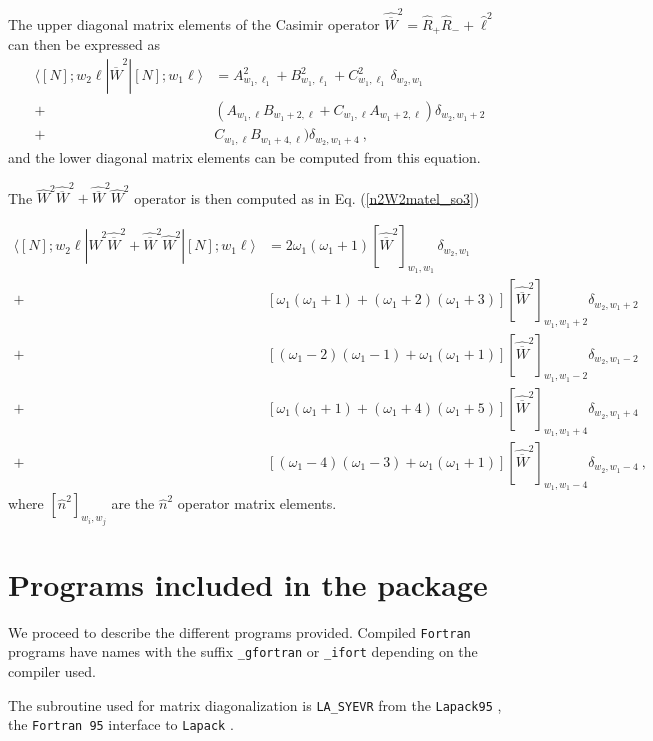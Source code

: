 \documentclass[a4paper,12pt,captions=tableheading]{article}
\begin{document}
The upper diagonal matrix elements of the Casimir operator \(\hat{\overline{W}}^2 = \hat R_{+}\hat R_{-} + \hat \ell^2\) can then be expressed as
\begin{align}
\langle [N];w_2 \ell|\hat{\overline{W}}^2|[N];w_1 \ell\rangle &=
 A^2_{w_1,\ell_1} + B^2_{w_1,\ell_1} + C^2_{w_1,\ell_1} \, \delta_{w_2,w_1} \nonumber\\
+& (A_{w_1,\ell}B_{w_1+2,\ell} + C_{w_1,\ell}A_{w_1+2,\ell})\delta_{w_2,w_1+2}\label{Wbar2matel_so3}\\
+& C_{w_1,\ell}B_{w_1+4,\ell})\delta_{w_2,w_1+4}\nonumber~,
\end{align}
\noindent and the lower diagonal matrix elements can be computed from this equation.

The \(\hat W^2 \hat{\overline{W}}^2 + \hat{\overline{W}}^2\hat W^2 \) operator is then computed as in Eq. (\ref{n2W2matel_so3})

\begin{align}
\langle [N];w_2 \ell|\hat W^2 \hat{\overline{W}}^2 + \hat{\overline{W}}^2\hat W^2|[N];w_1 \ell\rangle &=
 2\omega_1(\omega_1+1) [\hat{\overline{W}}^2]_{w_1,w_1}\, \delta_{w_2,w_1} \nonumber\\
+& \left[\omega_1(\omega_1+1) + (\omega_1 +2)(\omega_1+3)\right][\hat {\overline{W}}^2]_{w_1,w_1+2}\delta_{w_2,w_1+2}\nonumber\\
+& \left[(\omega_1 - 2)(\omega_1-1) + \omega_1 (\omega_1+1)\right][\hat {\overline{W}}^2]_{w_1,w_1-2}\delta_{w_2,w_1-2}\label{W2W2barmatel_so3}\\
+& \left[\omega_1(\omega_1+1) + (\omega_1 +4)(\omega_1+5)\right][\hat {\overline{W}}^2]_{w_1,w_1+4}\delta_{w_2,w_1+4}\nonumber\\
+& \left[(\omega_1 - 4)(\omega_1-3) + \omega_1 (\omega_1+1)\right][\hat {\overline{W}}^2]_{w_1,w_1-4}\delta_{w_2,w_1-4}\nonumber~,
\end{align}
\noindent where \([\hat n^2]_{w_i,w_j}\) are the \(\hat n^2\) operator matrix elements.


\section{Programs included in the package}
\label{sec-3}

We proceed to describe the different programs provided. Compiled
\verb~Fortran~ programs have names with the suffix  \verb~_gfortran~ or \verb~_ifort~
depending on the compiler used.

 The
subroutine used for matrix diagonalization is \verb~LA_SYEVR~ from the \verb~Lapack95~ \cite{LAPACK95}, the \verb~Fortran 95~
interface to \verb~Lapack~ \cite{laug}. 
\end{document}
